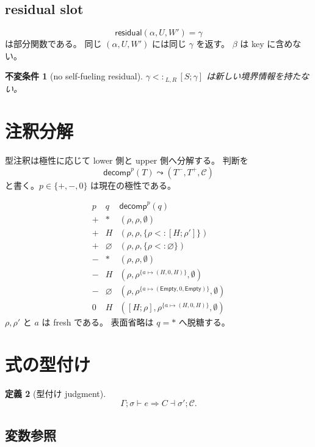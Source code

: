 \documentclass[uplatex,dvipdfmx,a4paper,11pt]{jsarticle}
\theoremstyle{jpplain}
\newtheorem{definition}{定義}[section]
\newtheorem{invariant}[definition]{不変条件}
\newcommand{\row}[2]{[#1;#2]}
\newcommand{\emptyrow}{\varnothing}
\newcommand{\Empty}{\mathsf{Empty}}
\newcommand{\subty}[3]{#1\mathrel{<:}_{#2,#3}}
\newcommand{\wocc}[2]{#1^{#2}}
\begin{document}
\subsection{residual slot}

\[
  \mathsf{residual}(\alpha,U,W')=\gamma
\]
は部分関数である。
同じ \((\alpha,U,W')\) には同じ \(\gamma\) を返す。
\(\beta\) は key に含めない。

\begin{invariant}[no self-fueling residual]
\(\subty{\gamma}{L}{R}\,\row{S}{\gamma}\) は新しい境界情報を持たない。
\end{invariant}

\section{注釈分解}

型注釈は極性に応じて lower 側と upper 側へ分解する。
判断を
\[
  \mathsf{decomp}^{p}(T)\leadsto (T^-,T^+,\mathcal C)
\]
と書く。\(p\in\{+,-,0\}\) は現在の極性である。

\[
\begin{array}{c|c|c}
p & q & \mathsf{decomp}^{p}(q)\\
\hline
+ & \ast & (\rho,\rho,\emptyset)\\
+ & H & (\rho,\rho,\{\rho<:\row{H}{\rho'}\})\\
+ & \emptyrow & (\rho,\rho,\{\rho<:\emptyrow\})\\
- & \ast & (\rho,\rho,\emptyset)\\
- & H & (\rho,\wocc{\rho}{\{a\mapsto(H,0,H)\}},\emptyset)\\
- & \emptyrow & (\rho,\wocc{\rho}{\{a\mapsto(\Empty,0,\Empty)\}},\emptyset)\\
0 & H & (\row{H}{\rho},\wocc{\rho}{\{a\mapsto(H,0,H)\}},\emptyset)
\end{array}
\]
\(\rho,\rho'\) と \(a\) は fresh である。
表面省略は \(q=\ast\) へ脱糖する。

\section{式の型付け}

\begin{definition}[型付け judgment]
\[
  \Gamma;\sigma \vdash e \Rightarrow C \dashv \sigma';\mathcal C.
\]
\end{definition}

\subsection{変数参照}
\end{document}
